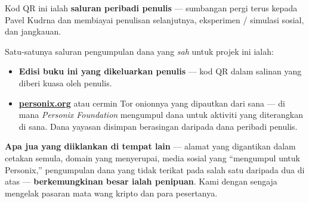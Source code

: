 \begin{minipage}[t]{0.60\textwidth}
\vspace{0pt}
\begin{mdframed}[
  linewidth=0.7pt,roundcorner=5pt,
  innerleftmargin=10pt,innerrightmargin=10pt,
  innertopmargin=8pt,innerbottommargin=8pt,
  skipabove=0pt,skipbelow=0pt,
  linecolor=cbwarning!50,backgroundcolor=cbwarning!5,
  nobreak=true,
  needspace=4\baselineskip,
]
\footnotesize
Kod QR ini ialah \textbf{saluran peribadi penulis} --- sumbangan pergi terus kepada Pavel Kudrna dan membiayai penulisan selanjutnya, eksperimen / simulasi sosial, dan jangkauan.

\smallskip
Satu-satunya saluran pengumpulan dana yang \emph{sah} untuk projek ini ialah:

\smallskip
\begin{itemize}
\setlength{\itemsep}{0pt}
\setlength{\topsep}{0pt}
\item \textbf{Edisi buku ini yang dikeluarkan penulis} --- kod QR dalam salinan yang diberi kuasa oleh penulis.
\item \href{https://personix.org}{\textbf{personix.org}} atau cermin Tor onionnya yang dipautkan dari sana --- di mana \emph{Personix Foundation} mengumpul dana untuk aktiviti yang diterangkan di sana. Dana yayasan disimpan berasingan daripada dana peribadi penulis.
\end{itemize}

\smallskip
\textbf{Apa jua yang diiklankan di tempat lain} --- alamat yang digantikan dalam cetakan semula, domain yang menyerupai, media sosial yang ``mengumpul untuk Personix,'' pengumpulan dana yang tidak terikat pada salah satu daripada dua di atas --- \textbf{berkemungkinan besar ialah penipuan}. Kami dengan sengaja mengelak pasaran mata wang kripto dan para pesertanya.
\end{mdframed}
\end{minipage}

\clearpage

